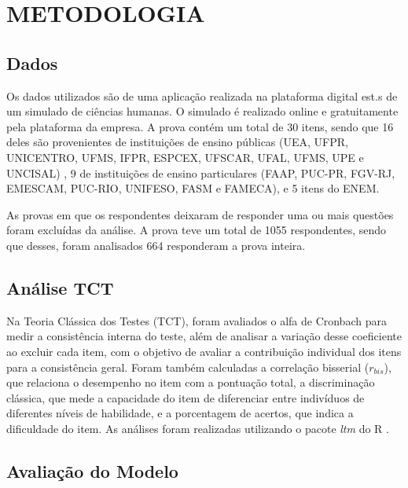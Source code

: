 \chapter{METODOLOGIA}

\section{Dados}

Os dados utilizados são  de uma aplicação realizada na plataforma digital est.s de um simulado de ciências humanas. O simulado é realizado online e gratuitamente pela plataforma da empresa. 
A prova contém um total de 30 itens, sendo que 16 deles são provenientes de instituições de ensino públicas (UEA, UFPR, UNICENTRO, UFMS, IFPR, ESPCEX, UFSCAR, UFAL, UFMS, UPE e UNCISAL) , 9 de instituições de ensino particulares (FAAP, PUC-PR, FGV-RJ, EMESCAM, PUC-RIO, UNIFESO, FASM e FAMECA), e 5 itens do ENEM.


As provas em que os respondentes deixaram de responder uma ou mais questões foram excluídas da análise. A prova teve um total de 1055 respondentes, sendo que desses, foram analisados 664 responderam a prova inteira.



\section{Análise TCT}

Na Teoria Clássica dos Testes (TCT), foram avaliados o alfa de Cronbach para medir a consistência interna do teste, além de analisar a variação desse coeficiente ao excluir cada item, com o objetivo de avaliar a contribuição individual dos itens para a consistência geral. Foram também calculadas a correlação bisserial ($r_{bis}$), que relaciona o desempenho no item com a pontuação total, a discriminação clássica, que mede a capacidade do item de diferenciar entre indivíduos de diferentes níveis de habilidade, e a porcentagem de acertos, que indica a dificuldade do item. As análises foram realizadas utilizando o pacote \textit{ltm} \cite{ltm} do R \cite{r}.




\section{Avaliação do Modelo}

